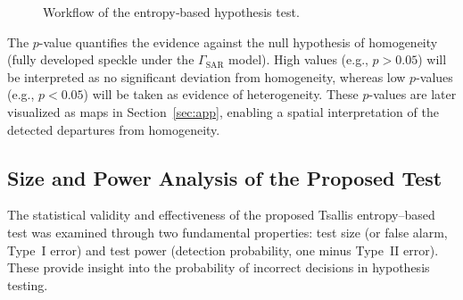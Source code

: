 \documentclass[
  lettersize  journal,
]{IEEEtran}%
\begin{document}
\begin{figure}[hbt]
    \centering
{}
    \caption{Workflow of the entropy‐based hypothesis test.}
    \label{fig:entropy-diagram-test}
\end{figure}

The \(p\)-value quantifies the evidence against the null hypothesis of
homogeneity (fully developed speckle under the \(\Gamma_{\text{SAR}}\)
model). High values (e.g., \(p>0.05\)) will be interpreted as no
significant deviation from homogeneity, whereas low \(p\)-values (e.g.,
\(p<0.05\)) will be taken as evidence of heterogeneity. These
\(p\)-values are later visualized as maps in Section~\ref{sec:app},
enabling a spatial interpretation of the detected departures from
homogeneity.

\subsection{Size and Power Analysis of the Proposed
Test}\label{size-and-power-analysis-of-the-proposed-test}

The statistical validity and effectiveness of the proposed Tsallis
entropy--based test was examined through two fundamental properties:
test size (or false alarm, Type~I error) and test power (detection
probability, one minus Type~II error). These provide insight into the
probability of incorrect decisions in hypothesis testing.
\end{document}
